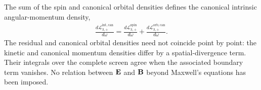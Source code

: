The sum of the spin and canonical orbital densities defines the canonical
intrinsic angular-momentum density,
\begin{align}
  \frac{d\mathcal L^{\mathrm{int,can}}_{3,+}}{d\omega}
  =\frac{d\mathcal L^{\mathrm{spin}}_{3,+}}{d\omega}
  +\frac{d\mathcal L^{\mathrm{orb,can}}_{3,+}}{d\omega}.
  \label{eq:one-sided-intrinsic-angular-momentum-density-split}
\end{align}
The residual and canonical orbital densities need not coincide point by point:
the kinetic and canonical momentum densities differ by a spatial-divergence
term.  Their integrals over the complete screen agree when the associated
boundary term vanishes.  No relation between ${\bf E}$ and ${\bf B}$ beyond
Maxwell's equations has been imposed.
